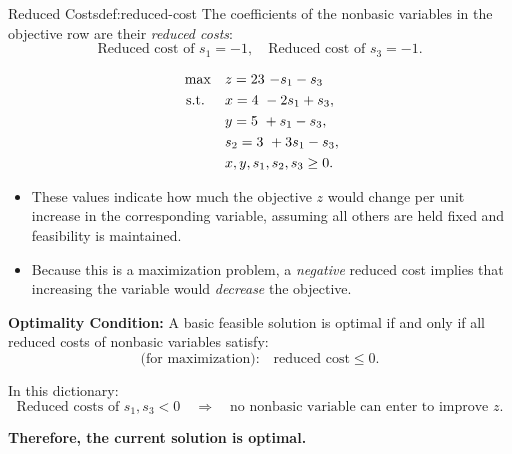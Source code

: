 \begin{remark}{Reduced Costs}{def:reduced-cost}
The coefficients of the nonbasic variables in the objective row are their \emph{reduced costs}:
\[
\text{Reduced cost of } s_1 = -1, \quad \text{Reduced cost of } s_3 = -1.
\]

\[
\begin{aligned}
\max \quad 
& z = 23~ \text{$- s_1 - s_3$} \tikzmark{zend2} \\
\st \quad 
& \tikzmark{x2} x = 4 ~ - 2s_1 + s_3, \\
& \tikzmark{y2} y = 5 ~ + s_1 - s_3, \\
& \tikzmark{s22} s_2 = 3~ + 3s_1 - s_3, \\
& x, y, s_1, s_2, s_3 \ge 0.
\end{aligned}
\]


\bigskip

\begin{itemize}
    \item These values indicate how much the objective \( z \) would change per unit increase in the corresponding variable, assuming all others are held fixed and feasibility is maintained.
    \item Because this is a maximization problem, a \emph{negative} reduced cost implies that increasing the variable would \emph{decrease} the objective.
\end{itemize}

\medskip

\noindent\textbf{Optimality Condition:}  
A basic feasible solution is optimal if and only if all reduced costs of nonbasic variables satisfy:
\[
\text{(for maximization):} \quad \text{reduced cost} \le 0.
\]

\medskip

In this dictionary:
\[
\text{Reduced costs of } s_1, s_3 < 0 \quad \Rightarrow \quad \text{no nonbasic variable can enter to improve } z.
\]

\textbf{Therefore, the current solution is optimal.}
\end{remark}

